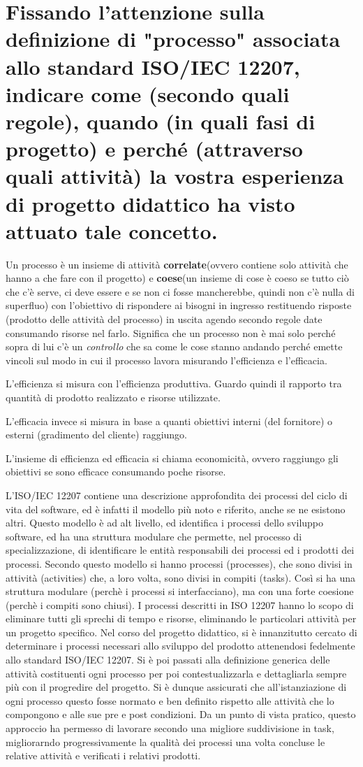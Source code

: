 \section{Fissando l'attenzione sulla definizione di "processo" associata allo standard ISO/IEC 12207, indicare come (secondo quali regole), quando (in quali fasi di progetto) e perché (attraverso quali attività) la vostra esperienza di progetto didattico ha visto attuato tale concetto.}

Un processo è un insieme di attività \textbf{correlate}(ovvero contiene solo attività che hanno a che fare con il progetto)  e \textbf{coese}(un insieme di cose è coeso se tutto ciò che c’è serve, ci deve essere e se non ci fosse mancherebbe, quindi non c'è nulla di superfluo) con l'obiettivo di rispondere ai bisogni in ingresso restituendo risposte (prodotto delle attività del processo) in uscita agendo secondo regole date consumando risorse nel farlo. Significa che un processo non è mai solo perché sopra di lui c’è un \textit{controllo} che sa come le cose stanno andando perché emette vincoli sul modo in cui il processo lavora misurando l'efficienza e l'efficacia.

L'efficienza si misura con l’efficienza produttiva. Guardo quindi il rapporto tra quantità di prodotto realizzato e risorse utilizzate.

L'efficacia invece si misura in base a quanti obiettivi interni (del fornitore) o esterni (gradimento del cliente) raggiungo.

L’insieme di efficienza ed efficacia si chiama economicità, ovvero raggiungo gli obiettivi se sono efficace consumando poche risorse.

L'ISO/IEC 12207 contiene una descrizione approfondita dei processi del ciclo di vita del software, ed è infatti il modello più noto e riferito, anche se ne esistono altri. Questo modello è ad alt livello, ed identifica i processi dello sviluppo software, ed ha una struttura modulare che permette, nel processo di specializzazione, di identificare le entità responsabili dei processi ed i prodotti dei processi.
Secondo questo modello si hanno processi (processes), che sono divisi in attività (activities) che, a loro volta, sono divisi in compiti (tasks). Così si ha una struttura modulare (perchè i processi si interfacciano), ma con una forte coesione (perchè i compiti sono chiusi). I processi descritti in ISO 12207  hanno lo scopo di eliminare tutti gli sprechi di tempo e risorse, eliminando le particolari attività per un progetto specifico.
Nel corso del progetto didattico, si è innanzitutto cercato di determinare i processi necessari allo sviluppo del prodotto attenendosi fedelmente allo standard ISO/IEC 12207. Si è poi passati alla definizione generica delle attività costituenti ogni processo per poi contestualizzarla e dettagliarla sempre più con il progredire del progetto. Si è dunque assicurati che all’istanziazione di ogni processo questo fosse normato e ben definito rispetto alle attività che lo compongono e alle sue pre e post condizioni. Da un punto di vista pratico, questo approccio ha permesso di lavorare secondo una migliore suddivisione in task, migliorarndo progressivamente la qualità dei processi una volta concluse le relative attività e verificati i relativi prodotti.